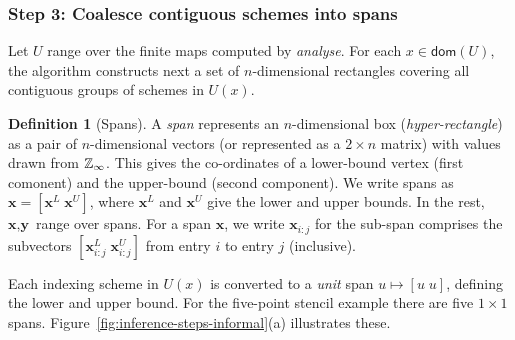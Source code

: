 \documentclass[9pt]{sigplanconf}
\newcounter{block}
\theoremstyle{definition}
\newtheorem{definition}[block]{Definition}
\newcommand{\vect}[1]{\textbf{#1}}
\begin{document}
\subsubsection{Step 3: Coalesce contiguous schemes into spans}
\label{sec:inf-step3}

Let $U$ range over the finite maps computed by \textit{analyse}.  For
each $x \in \mathsf{dom}(U)$, the algorithm 
constructs next a set of $n$-dimensional rectangles covering all contiguous groups of schemes
in $U(x)$. 

\newcommand{\spanOp}{\textsf{spans}}

\begin{definition}[Spans]
  A \emph{span} represents an $n$-dimensional box
  (\emph{hyper-rectangle}) as a pair of $n$-dimensional vectors (or
  represented as a $2 \times n$ matrix) with values drawn from
  $\mathbb{Z}_\infty{}$. This gives the co-ordinates of a lower-bound vertex
  (first comonent) and the upper-bound (second component). We write 
  spans as $\vect{x} = [\vect{x}^L \; \vect{x}^U]$, where $\vect{x}^L$
  and $\vect{x}^U$ give the lower and upper bounds.  In
  the rest, $\vect{x}, \vect{y}$ range over spans.  For a span
  $\vect{x}$, we write $\vect{x}_{i:j}$ for the sub-span comprises the
  subvectors $[\vect{x}^L_{i:j} \; \vect{x}^U_{i:j}]$ from entry $i$
  to entry $j$ (inclusive).
\end{definition}

\noindent
Each indexing scheme in $U(x)$ is converted to a \emph{unit} span $u \mapsto [u \; 
u]$, defining the lower and upper bound.
 For the five-point stencil example there are five $1 \times 1$ spans.
Figure~\ref{fig:inference-steps-informal}(a) illustrates these.
\end{document}
